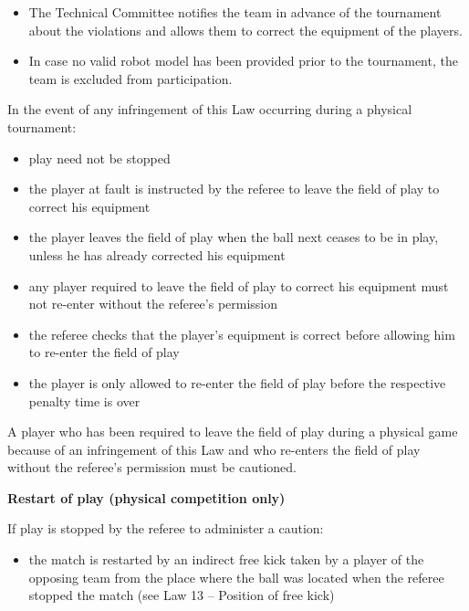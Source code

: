 \begin{itemize}
\item The Technical Committee notifies the team in advance of the tournament about the violations and allows them to correct the equipment of the players.
\item In case no valid robot model has been provided prior to the tournament, the team is excluded from participation.
\end{itemize}

In the event of any infringement of this Law occurring during a physical tournament:

\begin{itemize}
\item play need not be stopped
\item the player at fault is instructed by the referee to leave the field of play to correct his equipment
\item the player leaves the field of play when the ball next ceases to be in play, unless he has already corrected his equipment
\item any player required to leave the field of play to correct his equipment must not re-enter without the referee's permission
\item the referee checks that the player's equipment is correct before allowing him to re-enter the field of play
\item the player is only allowed to re-enter the field of play before the respective penalty time is over 
\end{itemize}

\bigskip

A player who has been required to leave the field of play during a physical game because of an infringement of this Law and who re-enters the field of play without the referee's permission must be cautioned.

\bigskip


\clearpage
{\bfseries Restart of play (physical competition only)}

\headlinebox

If play is stopped by the referee to administer a caution:

\begin{itemize}
\item the match is restarted by an indirect free kick taken by a player of the opposing team from the place where the ball was located when the referee stopped the match (see Law 13 -- Position of free kick)
\end{itemize}


